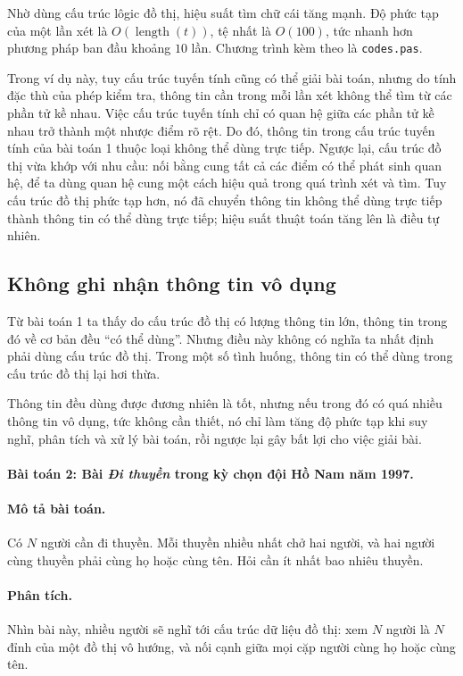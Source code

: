 \documentclass[11pt]{article}
\begin{document}
Nhờ dùng cấu trúc lôgic đồ thị, hiệu suất tìm chữ cái tăng mạnh. Độ phức tạp
của một lần xét là \(O(\operatorname{length}(t))\), tệ nhất là \(O(100)\),
tức nhanh hơn phương pháp ban đầu khoảng \(10\) lần. Chương trình kèm theo là
\texttt{codes.pas}.

Trong ví dụ này, tuy cấu trúc tuyến tính cũng có thể giải bài toán, nhưng do
tính đặc thù của phép kiểm tra, thông tin cần trong mỗi lần xét không thể tìm
từ các phần tử kề nhau. Việc cấu trúc tuyến tính chỉ có quan hệ giữa các phần
tử kề nhau trở thành một nhược điểm rõ rệt. Do đó, thông tin trong cấu trúc
tuyến tính của bài toán 1 thuộc loại không thể dùng trực tiếp. Ngược lại, cấu
trúc đồ thị vừa khớp với nhu cầu: nối bằng cung tất cả các điểm có thể phát
sinh quan hệ, để ta dùng quan hệ cung một cách hiệu quả trong quá trình xét
và tìm. Tuy cấu trúc đồ thị phức tạp hơn, nó đã chuyển thông tin không thể
dùng trực tiếp thành thông tin có thể dùng trực tiếp; hiệu suất thuật toán
tăng lên là điều tự nhiên.

\subsection{Không ghi nhận thông tin vô dụng}

Từ bài toán 1 ta thấy do cấu trúc đồ thị có lượng thông tin lớn, thông tin
trong đó về cơ bản đều ``có thể dùng''. Nhưng điều này không có nghĩa ta nhất
định phải dùng cấu trúc đồ thị. Trong một số tình huống, thông tin có thể dùng
trong cấu trúc đồ thị lại hơi thừa.

Thông tin đều dùng được đương nhiên là tốt, nhưng nếu trong đó có quá nhiều
thông tin vô dụng, tức không cần thiết, nó chỉ làm tăng độ phức tạp khi suy
nghĩ, phân tích và xử lý bài toán, rồi ngược lại gây bất lợi cho việc giải
bài.

\paragraph{Bài toán 2: Bài \textit{Đi thuyền} trong kỳ chọn đội Hồ Nam năm
1997.}

\paragraph{Mô tả bài toán.}
Có \(N\) người cần đi thuyền. Mỗi thuyền nhiều nhất chở hai người, và hai
người cùng thuyền phải cùng họ hoặc cùng tên. Hỏi cần ít nhất bao nhiêu
thuyền.

\paragraph{Phân tích.}
Nhìn bài này, nhiều người sẽ nghĩ tới cấu trúc dữ liệu đồ thị: xem \(N\)
người là \(N\) đỉnh của một đồ thị vô hướng, và nối cạnh giữa mọi cặp người
cùng họ hoặc cùng tên.
\end{document}
